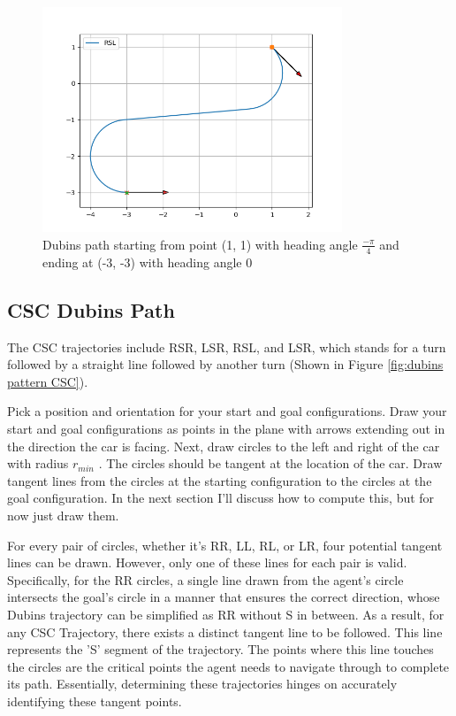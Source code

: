 \begin{figure}[h]
\centering
\includegraphics[width=0.8\textwidth]{fig/dubins/dubins_example.png}
\caption{Dubins path starting from point (1, 1) with heading angle $\frac{-\pi}{4}$ and ending at (-3, -3) with heading angle 0}
\label{fig:dubins_example}
\end{figure}

\subsection{CSC Dubins Path}

The CSC trajectories include RSR, LSR, RSL, and LSR, which stands for a turn followed by a straight line followed by another turn (Shown in Figure \ref{fig:dubins pattern CSC}).

Pick a position and orientation for your start and goal configurations. Draw your start and goal configurations as points in the plane with arrows extending out in the direction the car is facing. Next, draw circles to the left and right of the car with radius $r_{min}$ . The circles should be tangent at the location of the car. Draw tangent lines from the circles at the starting configuration to the circles at the goal configuration. In the next section I’ll discuss how to compute this, but for now just draw them.

For every pair of circles, whether it's RR, LL, RL, or LR, four potential tangent lines can be drawn. However, only one of these lines for each pair is valid. Specifically, for the RR circles, a single line drawn from the agent's circle intersects the goal's circle in a manner that ensures the correct direction, whose Dubins trajectory can be simplified as RR without S in between. As a result, for any CSC Trajectory, there exists a distinct tangent line to be followed. This line represents the 'S' segment of the trajectory. The points where this line touches the circles are the critical points the agent needs to navigate through to complete its path. Essentially, determining these trajectories hinges on accurately identifying these tangent points.

